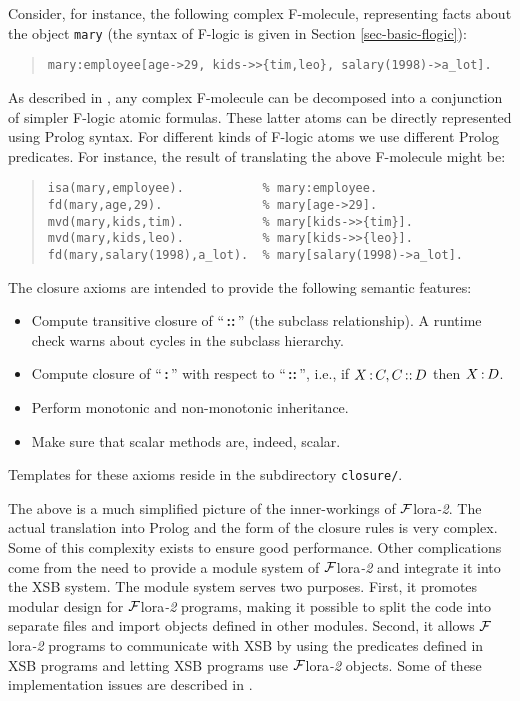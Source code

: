 \documentclass[11pt]{article}
\newcommand{\isa}{\,{\bf{:}}\,}
\newcommand{\subcl}{\,{\bf{::}}\,}
\newcommand{\FLORA}{{\mbox{${\cal F}${\sc lora}\rm\emph{-2}}}\xspace}
\newcommand{\fl}{\mbox{F-logic}\xspace}
\begin{document}
Consider, for instance, the following complex F-molecule, representing
facts about the object \texttt{mary} (the syntax of \fl is given in
Section \ref{sec-basic-flogic}):

\begin{quote}
{\small\begin{verbatim}
mary:employee[age->29, kids->>{tim,leo}, salary(1998)->a_lot].
\end{verbatim}}
\end{quote}

As described in \cite{KLW95}, any complex F-molecule can be
decomposed into a conjunction of simpler \fl atomic formulas. These
latter atoms can be directly represented using Prolog syntax.  For
different kinds of \fl atoms we use different Prolog predicates. For
instance, the result of translating the above F-molecule might be:

\begin{quote}
{\small
\begin{verbatim}
isa(mary,employee).           % mary:employee.
fd(mary,age,29).              % mary[age->29].
mvd(mary,kids,tim).           % mary[kids->>{tim}].
mvd(mary,kids,leo).           % mary[kids->>{leo}].
fd(mary,salary(1998),a_lot).  % mary[salary(1998)->a_lot].
\end{verbatim}
  }
\end{quote}

The closure axioms are intended to provide the following semantic features:
\begin{itemize}
\item Compute transitive closure of ``\subcl'' (the subclass relationship).  A
  runtime check warns about cycles in the subclass hierarchy.
\item Compute closure of ``\isa'' with respect to ``\subcl'', i.e., if $X\isa C,
  C\subcl D$ then $X\isa D$.
\item Perform monotonic and non-monotonic inheritance.
\item Make sure that scalar methods are, indeed, scalar.
\end{itemize}
Templates for these axioms reside in the subdirectory \texttt{closure/}.

The above is a much simplified picture of the inner-workings of \FLORA. The
actual translation into Prolog and the form of the closure rules is very
complex.  Some of this complexity exists to ensure good performance.  Other
complications come from the need to provide a module system of \FLORA and
integrate it into the XSB system.  The module system serves two purposes.
First, it promotes modular design for \FLORA programs, making it possible
to split the code into separate files and import objects defined in other
modules. Second, it allows \FLORA programs to communicate with XSB by using
the predicates defined in XSB programs and letting XSB programs use \FLORA
objects.  Some of these implementation issues are described in
\cite{guiz-flora-00}.
\end{document}

